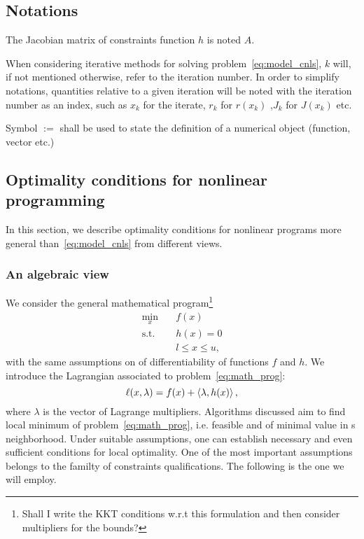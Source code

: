 \documentclass[10pt]{article}
\numberwithin{equation}{section}
\begin{document}
	\subsection{Notations}
	 
	
	The Jacobian matrix of constraints function $h$ is noted $A$.
	
	When considering iterative methods for solving problem~\eqref{eq:model_cnls}, $k$ will, if not mentioned otherwise, refer to the iteration number. In order to simplify notations, quantities relative to a given iteration will be noted with the iteration number as an index, such as $x_k$ for the iterate, $r_k$ for $r(x_k)$ ,$J_k$ for $J(x_k)$ etc.
	
	Symbol $:=$ shall be used to state the definition of a numerical object (function, vector etc.)
	
	\subsection{Optimality conditions for nonlinear programming}
	
	In this section, we describe optimality conditions for nonlinear programs more general than~\eqref{eq:model_cnls} from different views.
	
	\subsubsection{An algebraic view}
	
	We consider the general mathematical program\footnote{Shall I write the KKT conditions w.r.t this formulation and then consider multipliers for the bounds?}
	\begin{equation}
		\label{eq:math_prog}
		\begin{aligned}
			\min_x \quad & f(x) \\
			\text{s.t.} \quad & h(x)=0 \\
			& l \le x \le u,
		\end{aligned}
	\end{equation}
	with the same assumptions on of differentiability of functions $f$ and \(h\). We introduce the Lagrangian associated to problem~\eqref{eq:math_prog}:
	\begin{equation}
		\label{eq:lagrangian}
		\ell(x,\lambda) = f(x) + \left\langle {\lambda} , {h(x)} \right\rangle,
	\end{equation}
	where $\lambda$ is the vector of Lagrange multipliers. Algorithms discussed aim to find local minimum of problem~\eqref{eq:math_prog}, i.e. feasible and of minimal value in s neighborhood. Under suitable assumptions, one can establish necessary and even sufficient conditions for local optimality. One of the most important assumptions belongs to the familty of constraints qualifications. The following is the one we will employ.
	
\end{document}
